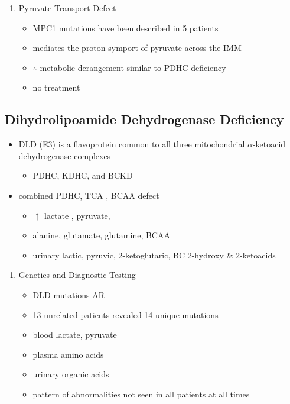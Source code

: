 \documentclass{scrartcl}
\begin{document}
\begin{enumerate}
\item Pyruvate Transport Defect
\label{sec:org848634c}
\begin{itemize}
\item MPC1 mutations have been described in 5 patients
\item mediates the proton symport of pyruvate across the IMM
\item \(\therefore\) metabolic derangement similar to PDHC deficiency
\item no treatment
\end{itemize}
\end{enumerate}

\subsection{Dihydrolipoamide Dehydrogenase Deficiency}
\label{sec:org9c2f8bc}
\begin{itemize}
\item DLD (E3) is a flavoprotein common to all three mitochondrial
\(\alpha\)-ketoacid dehydrogenase complexes
\begin{itemize}
\item PDHC, KDHC, and BCKD
\end{itemize}
\item combined PDHC, TCA , BCAA defect
\begin{itemize}
\item \(\uparrow\) lactate , pyruvate,
\item alanine, glutamate, glutamine, BCAA
\item urinary lactic, pyruvic, 2-ketoglutaric, BC 2-hydroxy \& 2-ketoacids
\end{itemize}
\end{itemize}

\begin{enumerate}
\item Genetics and Diagnostic Testing
\label{sec:orgb9a981c}
\begin{itemize}
\item DLD mutations AR
\item 13 unrelated patients revealed 14 unique mutations
\item blood lactate, pyruvate
\item plasma amino acids
\item urinary organic acids
\item pattern of abnormalities not seen in all patients at all times
\end{itemize}
\end{enumerate}
\end{document}

